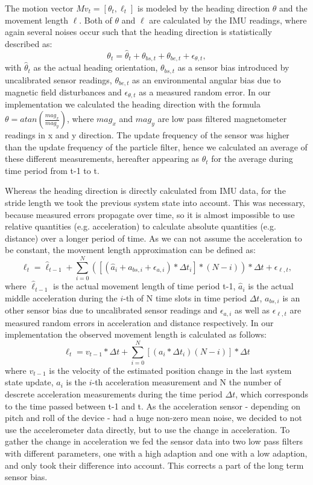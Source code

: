 The motion vector $Mv_{t} = [\theta_{t}, \ell_{t}]$ is modeled by the heading direction $\theta$ and the movement length $\ell$. Both of $\theta$ and $\ell$ are calculated by the IMU readings, where again several noises occur such that the heading direction is statistically described as:
$$\theta_{t} = \hat{\theta}_{t} + \theta_{bs,t} + \theta_{be,t} + \epsilon_{\theta, t},$$
with $\hat{\theta}_{t}$ as the actual heading orientation,  $\theta_{bs,t}$ as a sensor bias introduced by uncalibrated sensor readings, $\theta_{be,t}$ as an environmental angular bias due to magnetic field disturbances and $\epsilon_{\theta, t}$ as a measured random error. 
In our implementation we calculated the heading direction with the formula $\theta = atan(\frac{mag_{x}}{mag_{y}})$, where $mag_{x}$ and $mag_{y}$ are low pass filtered magnetometer readings in x and y direction. The update frequency of the sensor was higher than the update frequency of the particle filter, hence we calculated an average of these different measurements, hereafter appearing as $\theta_{t}$ for the average during time period from t-1 to t.

Whereas the heading direction is directly calculated from IMU data, for the stride length we took the previous system state into account. This was necessary, because measured errors propagate over time, so it is almost impossible to use relative quantities (e.g. acceleration) to calculate absolute quantities (e.g. distance) over a longer period of time. As we can not assume the acceleration to be constant, the movement length approximation can be defined as: 
$$\ell_{t} = \hat{\ell}_{t-1} + \sum_{i=0}^{N}([(\hat{a}_{i} + a_{bs,i} +\epsilon_{a, i}) * \Delta t_{i} ]*(N-i)) *\Delta t + \epsilon_{\ell, t},$$
where $\hat{\ell}_{t-1}$ is the actual movement length of time period t-1, $\hat{a}_{i}$ is the actual middle acceleration during the $i$-th of N time slots in time period $\Delta t$, $a_{bs,i}$ is an other sensor bias due to uncalibrated sensor readings and $\epsilon_{a, i}$ as well as $\epsilon_{\ell, t}$ are measured random errors in acceleration and distance respectively.
In our implementation the observed movement length is calculated as follows:
$$\ell_{t} = v_{t-1} * \Delta t + \sum_{i=0}^N [(a_{i} * \Delta t_{i})(N-i)]* \Delta t$$
where $v_{t-1}$ is the velocity of the estimated position change in the last system state update, $a_{i}$ is the $i$-th acceleration measurement and N the number of descrete acceleration measurements during the time period $\Delta t$, which corresponds to the time passed between t-1 and t. As the acceleration sensor - depending on pitch and roll of the device - had a huge non-zero mean noise, we decided to not use the accelerometer data directly, but to use the change in acceleration. To gather the change in acceleration we fed the sensor data into two low pass filters with different parameters, one with a high adaption and one with a low adaption, and only took their difference into account. This corrects a part of the long term sensor bias. 

